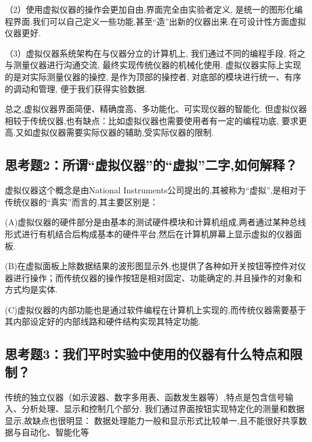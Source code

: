 \documentclass[11pt]{article}
\begin{document}
（2）使用虚拟仪器的操作会更加自由,界面完全由实验者定义, 是统一的图形化编程界面.我们可以自己定义一些功能,甚至“造”出新的仪器出来.在可设计性方面虚拟仪器更好.

（3）虚拟仪器系统架构在与仪器分立的计算机上, 我们通过不同的编程手段, 将之与测量仪器进行沟通交流, 最终实现传统仪器的机械化使用.
虚拟仪器实际上实现的是对实际测量仪器的操控, 是作为顶部的操控者, 对底部的模块进行统一、有序的调动和管理, 便于我们获得实验数据. 

总之,虚拟仪器界面简便、精确度高、多功能化、可实现仪器的智能化.
但虚拟仪器相较于传统仪器,也有缺点：比如虚拟仪器也需要使用者有一定的编程功底, 要求更高.又如虚拟仪器需要实际仪器的辅助,受实际仪器的限制.

\subsection*{思考题2：\textbf{所谓“虚拟仪器”的“虚拟”二字,如何解释？}}
虚拟仪器这个概念是由National Instruments公司提出的,其被称为“虚拟”,是相对于传统仪器的“真实”而言的,其主要区别是：

(A)虚拟仪器的硬件部分是由基本的测试硬件模块和计算机组成,两者通过某种总线形式进行有机结合后构成基本的硬件平台,然后在计算机屏幕上显示虚拟的仪器面板.

(B)在虚拟面板上除数据结果的波形图显示外,也提供了各种如开关按钮等控件对仪器进行操作；而传统仪器的操作按钮是相对固定、功能确定的,并且操作的对象和方式均是实体.

(C)虚拟仪器的内部功能也是通过软件编程在计算机上实现的,而传统仪器需要基于其内部设定好的内部线路和硬件结构实现其特定功能.

\subsection*{思考题3：\textbf{我们平时实验中使用的仪器有什么特点和限制？}}
传统的独立仪器（如示波器、数字多用表、函数发生器等）,特点是包含信号输入、分析处理、显示和控制几个部分.
我们通过界面按钮实现特定化的测量和数据显示,故缺点也很明显：
数据处理能力一般和显示形式比较单一,且不能很好共享数据与自动化、智能化等

\end{document}
